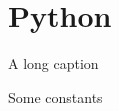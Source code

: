 \chapter{Python}


\begin{algorithm}
    \caption[Short caption]{A long caption}
    \begin{algorithmic}[1]
        \Require 
        Some constants
    \end{algorithmic}
\end{algorithm}
